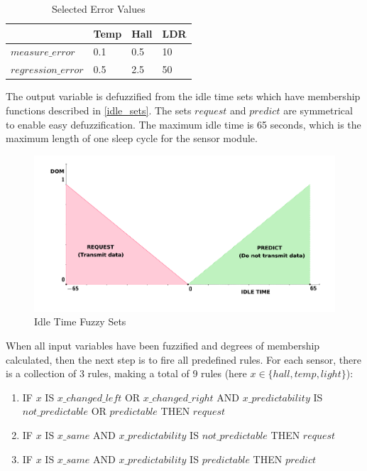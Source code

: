 \begin{table}[h]
\centering
  \begin{tabular}{| l | l | l | l |}
    \hline
     & Temp & Hall & LDR \\ \hline
    $measure\_error$ & 0.1 & 0.5 & 10 \\ \hline
    $regression\_error$ & 0.5 & 2.5 & 50 \\
    \hline
  \end{tabular}
\caption{Selected Error Values}
\label{errors_table}
\end{table}

The output variable is defuzzified from the idle time sets which have membership functions described in \autoref{idle_sets}. The sets $request$ and $predict$ are symmetrical to enable easy defuzzification. The maximum idle time is 65 seconds, which is the maximum length of one sleep cycle for the sensor module. 

\begin{figure}[h!]
\centering
\includegraphics[scale=0.58]{4/figures/result_sets.pdf}
\caption{Idle Time Fuzzy Sets}
\label{idle_sets}
\end{figure}

When all input variables have been fuzzified and degrees of membership calculated, then the next step is to fire all predefined rules. For each sensor, there is a collection of 3 rules, making a total of 9 rules (here $x \in \{hall, temp, light\}$):

\begin{enumerate}
\item IF $x$ IS $x\_changed\_left$ OR $x\_changed\_right$ AND $x\_predictability$ IS $not\_predictable$ OR $predictable$ THEN $request$
\item IF $x$ IS $x\_same$ AND $x\_predictability$ IS $not\_predictable$ THEN $request$
\item IF $x$ IS $x\_same$ AND $x\_predictability$ IS $predictable$ THEN $predict$
\end{enumerate}

